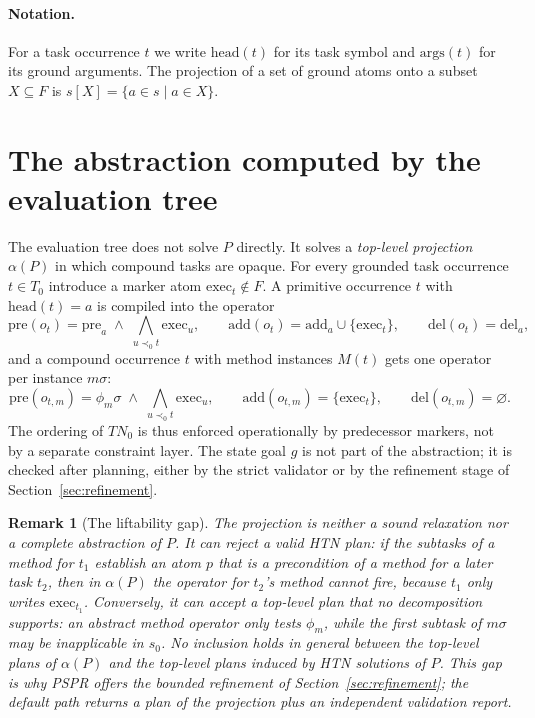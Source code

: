 \documentclass[11pt,a4paper]{article}
\newtheorem{remark}[definition]{Remark}
\newcommand{\exec}{\mathrm{exec}}
\newcommand{\pre}{\mathrm{pre}}
\newcommand{\add}{\mathrm{add}}
\newcommand{\del}{\mathrm{del}}
\begin{document}
\paragraph{Notation.}
For a task occurrence $t$ we write $\mathrm{head}(t)$ for its task symbol and
$\mathrm{args}(t)$ for its ground arguments. The projection of a set of ground
atoms onto a subset $X\subseteq F$ is $s[X]=\{a\in s\mid a\in X\}$.

\section{The abstraction computed by the evaluation tree}

The evaluation tree does not solve $P$ directly. It solves a
\emph{top-level projection} $\alpha(P)$ in which compound tasks are opaque.
For every grounded task occurrence $t\in T_0$ introduce a marker atom
$\exec_t\notin F$. A primitive occurrence $t$ with $\mathrm{head}(t)=a$ is
compiled into the operator
\begin{equation}
\pre(o_t)=\pre_a\;\wedge\;\bigwedge_{u\prec_0 t}\exec_u,
\qquad
\add(o_t)=\add_a\cup\{\exec_t\},
\qquad
\del(o_t)=\del_a,
\label{eq:abstract-action}
\end{equation}
and a compound occurrence $t$ with method instances $M(t)$ gets one operator
per instance $m\sigma$:
\begin{equation}
\pre(o_{t,m})=\phi_m\sigma\;\wedge\;\bigwedge_{u\prec_0 t}\exec_u,
\qquad
\add(o_{t,m})=\{\exec_t\},
\qquad
\del(o_{t,m})=\varnothing.
\label{eq:abstract-method}
\end{equation}
The ordering of $TN_0$ is thus enforced operationally by predecessor markers,
not by a separate constraint layer. The state goal $g$ is not part of the
abstraction; it is checked after planning, either by the strict validator or by
the refinement stage of Section~\ref{sec:refinement}.

\begin{remark}[The liftability gap]
The projection is neither a sound relaxation nor a complete abstraction of $P$.
It can \emph{reject} a valid HTN plan: if the subtasks of a method for $t_1$
establish an atom $p$ that is a precondition of a method for a later task $t_2$,
then in $\alpha(P)$ the operator for $t_2$'s method cannot fire, because
$t_1$ only writes $\exec_{t_1}$. Conversely, it can \emph{accept} a top-level
plan that no decomposition supports: an abstract method operator only tests
$\phi_m$, while the first subtask of $m\sigma$ may be inapplicable in $s_0$.
No inclusion holds in general between the top-level plans of $\alpha(P)$ and
the top-level plans induced by HTN solutions of $P$. This gap is why PSPR
offers the bounded refinement of Section~\ref{sec:refinement}; the default
path returns a plan of the projection plus an independent validation report.
\end{remark}
\end{document}
